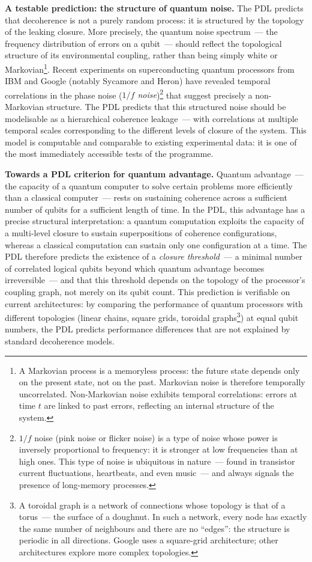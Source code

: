 \documentclass[12pt, a4paper, openright]{book}
\begin{document}
\textbf{A testable prediction: the structure of quantum noise.} The PDL predicts that decoherence is not a purely random process: it is structured by the topology of the leaking closure. More precisely, the quantum noise spectrum~--- the frequency distribution of errors on a qubit~--- should reflect the topological structure of its environmental coupling, rather than being simply white or Markovian\footnote{A Markovian process is a memoryless process: the future state depends only on the present state, not on the past. Markovian noise is therefore temporally uncorrelated. Non-Markovian noise exhibits temporal correlations: errors at time $t$ are linked to past errors, reflecting an internal structure of the system.}. Recent experiments on superconducting quantum processors from IBM and Google (notably Sycamore and Heron) have revealed temporal correlations in the phase noise (\emph{$1/f$ noise})\footnote{$1/f$ noise (pink noise or flicker noise) is a type of noise whose power is inversely proportional to frequency: it is stronger at low frequencies than at high ones. This type of noise is ubiquitous in nature~--- found in transistor current fluctuations, heartbeats, and even music~--- and always signals the presence of long-memory processes.} that suggest precisely a non-Markovian structure. The PDL predicts that this structured noise should be modelisable as a hierarchical coherence leakage~--- with correlations at multiple temporal scales corresponding to the different levels of closure of the system. This model is computable and comparable to existing experimental data: it is one of the most immediately accessible tests of the programme.

\medskip

\textbf{Towards a PDL criterion for quantum advantage.} Quantum advantage~--- the capacity of a quantum computer to solve certain problems more efficiently than a classical computer~--- rests on sustaining coherence across a sufficient number of qubits for a sufficient length of time. In the PDL, this advantage has a precise structural interpretation: a quantum computation exploits the capacity of a multi-level closure to sustain superpositions of coherence configurations, whereas a classical computation can sustain only one configuration at a time. The PDL therefore predicts the existence of a \emph{closure threshold}~--- a minimal number of correlated logical qubits beyond which quantum advantage becomes irreversible~--- and that this threshold depends on the topology of the processor's coupling graph, not merely on its qubit count. This prediction is verifiable on current architectures: by comparing the performance of quantum processors with different topologies (linear chains, square grids, toroidal graphs\footnote{A toroidal graph is a network of connections whose topology is that of a torus~--- the surface of a doughnut. In such a network, every node has exactly the same number of neighbours and there are no ``edges'': the structure is periodic in all directions. Google uses a square-grid architecture; other architectures explore more complex topologies.}) at equal qubit numbers, the PDL predicts performance differences that are not explained by standard decoherence models.
\end{document}
